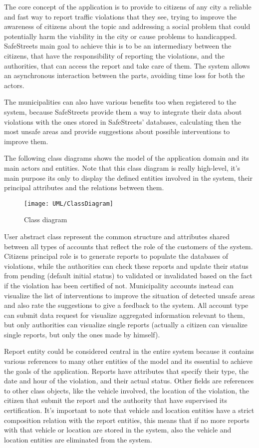 The core concept of the application is to provide to citizens of any city a reliable and fast way to report traffic violations that they see, trying to improve the awareness of citizens about the topic and addressing a social problem that could potentially harm the viability in the city or cause problems to handicapped. SafeStreets main goal to achieve this is to be an intermediary between the citizens, that have the responsibility of reporting the violations, and the authorities, that can access the report and take care of them. The system allows an asynchronous interaction between the parts, avoiding time loss for both the actors.

The municipalities can also have various benefits too when registered to the system, because SafeStreets provide them a way to integrate their data about violations with the ones stored in SafeStreets' databases, calculating then the most unsafe areas and provide suggestions about possible interventions to improve them.

The following class diagrams shows the model of the application domain and its main actors and entities. Note that this class diagram is really high-level, it's main purpose its only to display the defined entities involved in the system, their principal attributes and the relations between them.

\begin{figure}[H]
	\centering
	\texttt{[image: UML/ClassDiagram]}
	\caption{Class diagram}
\end{figure}

User abstract class represent the common structure and attributes shared between all types of accounts that reflect the role of the customers of the system. Citizens principal role is to generate reports to populate the databases of violations, while the authorities can check these reports and update their status from pending (default initial status) to validated or invalidated based on the fact if the violation has been certified of not. Municipality accounts instead can visualize the list of interventions to improve the situation of detected unsafe areas and also rate the suggestions to give a feedback to the system. All account type can submit data request for visualize aggregated information relevant to them, but only authorities can visualize single reports (actually a citizen can visualize single reports, but only the ones made by himself).

Report entity could be considered central in the entire system because it contains various references to many other entities of the model and its essential to achieve the goals of the application. Reports have attributes that specify their type, the date and hour of the violation, and their actual status. Other fields are references to other class objects, like the vehicle involved, the location of the violation, the citizen that submit the report and the authority that have supervised its certification. It's important to note that vehicle and location entities have a strict composition relation with the report entities, this means that if no more reports with that vehicle or location are stored in the system, also the vehicle and location entities are eliminated from the system.

